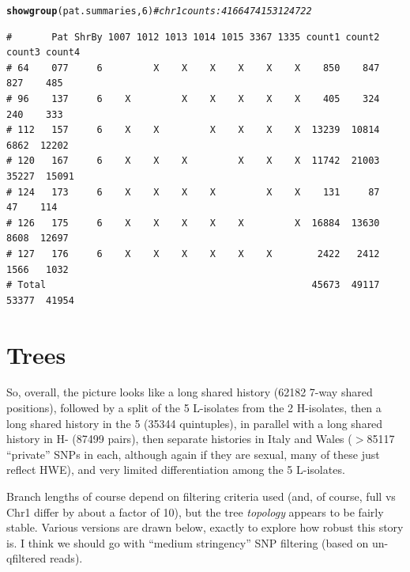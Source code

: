 \documentclass{article}\usepackage[]{graphicx}\usepackage[]{color}
\makeatletter
\newcommand{\hlnum}[1]{\textcolor[rgb]{0.686,0.059,0.569}{#1}}%
\newcommand{\hlcom}[1]{\textcolor[rgb]{0.678,0.584,0.686}{\textit{#1}}}%
\newcommand{\hlstd}[1]{\textcolor[rgb]{0.345,0.345,0.345}{#1}}%
\newcommand{\hlkwd}[1]{\textcolor[rgb]{0.737,0.353,0.396}{\textbf{#1}}}%
\newenvironment{kframe}{%
 \def\at@end@of@kframe{}%
 \ifinner\ifhmode%
  \def\at@end@of@kframe{\end{minipage}}%
  \begin{minipage}{\columnwidth}%
 \fi\fi%
 \def\FrameCommand##1{\hskip\@totalleftmargin \hskip-\fboxsep
 \colorbox{shadecolor}{##1}\hskip-\fboxsep
     \hskip-\linewidth \hskip-\@totalleftmargin \hskip\columnwidth}%
 \MakeFramed {\advance\hsize-\width
   \@totalleftmargin\z@ \linewidth\hsize
   \@setminipage}}%
 {\par\unskip\endMakeFramed%
 \at@end@of@kframe}
\newenvironment{knitrout}{}{} %
\makeatother
\begin{document}
\begin{knitrout}\footnotesize
{}\color{fgcolor}\begin{kframe}
\begin{alltt}
\hlkwd{showgroup}\hlstd{(pat.summaries,}\hlnum{6}\hlstd{)} \hlcom{# chr 1 counts:  4166   4741   5312  4722}
\end{alltt}
\begin{verbatim}
#       Pat ShrBy 1007 1012 1013 1014 1015 3367 1335 count1 count2 count3 count4
# 64    077     6         X    X    X    X    X    X    850    847    827    485
# 96    137     6    X         X    X    X    X    X    405    324    240    333
# 112   157     6    X    X         X    X    X    X  13239  10814   6862  12202
# 120   167     6    X    X    X         X    X    X  11742  21003  35227  15091
# 124   173     6    X    X    X    X         X    X    131     87     47    114
# 126   175     6    X    X    X    X    X         X  16884  13630   8608  12697
# 127   176     6    X    X    X    X    X    X        2422   2412   1566   1032
# Total                                               45673  49117  53377  41954
\end{verbatim}
\end{kframe}
\end{knitrout}

\section{Trees}
So, overall, the picture looks like a long shared history
  (62182 7-way shared positions),
followed by a split of the 5 L-isolates from the 2 H-isolates, then a long shared history in the 5
  (35344 quintuples),
in parallel with a long shared history in H-
  (87499 pairs),
then separate histories in Italy and Wales
  ($>$85117 
  ``private'' SNPs in each, although again if they are sexual, many of these just reflect HWE),
and very limited differentiation among the 5 L-isolates.  

Branch lengths of course depend on filtering criteria used (and, of course, full vs Chr1 differ by 
about a factor of 10), but the tree \emph{topology} appears to be fairly stable.  Various versions 
are drawn below, exactly to explore how robust this story is.  I think we should go with ``medium 
stringency'' SNP filtering (based on un-qfiltered reads).
\end{document}
